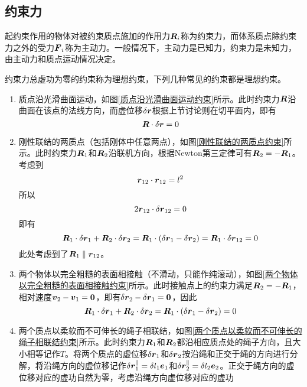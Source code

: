 \subsection{约束力}

起约束作用的物体对被约束质点施加的作用力$\boldsymbol{R}_i$称为{\heiti 约束力}，而体系质点除约束力之外的受力$\boldsymbol{F}_i$称为{\heiti 主动力}。一般情况下，主动力是已知力，约束力是未知力，由主动力和质点运动情况决定。

约束力总虚功为零的约束称为{\heiti 理想约束}，下列几种常见的约束都是理想约束。
\begin{enumerate}
	\item 质点沿光滑曲面运动，如图\ref{质点沿光滑曲面运动约束}所示。此时约束力$\boldsymbol{R}$沿曲面在该点的法线方向，而虚位移$\delta \boldsymbol{r}$根据上节讨论则在切平面内，即有
	\begin{equation*}
		\boldsymbol{R} \cdot \delta \boldsymbol{r} = 0
	\end{equation*}
	\item 刚性联结的两质点（包括刚体中任意两点），如图\ref{刚性联结的两质点约束}所示。此时约束力$\boldsymbol{R}_1$和$\boldsymbol{R}_2$沿联机方向，根据Newton第三定律可有$\boldsymbol{R}_2=-\boldsymbol{R}_1$。考虑到
	\begin{equation*}
		\boldsymbol{r}_{12} \cdot \boldsymbol{r}_{12} = l^2
	\end{equation*}
	所以
	\begin{equation*}
		2\boldsymbol{r}_{12} \cdot \delta \boldsymbol{r}_{12} = 0
	\end{equation*}
	即有
	\begin{equation*}
		\boldsymbol{R}_1 \cdot \delta \boldsymbol{r}_1 + \boldsymbol{R}_2 \cdot \delta \boldsymbol{r}_2 = \boldsymbol{R}_1 \cdot (\delta \boldsymbol{r}_1 - \delta \boldsymbol{r}_2) = \boldsymbol{R}_1 \cdot \delta \boldsymbol{r}_{12} = 0
	\end{equation*}
	此处考虑到了$\boldsymbol{R}_1 \parallel \boldsymbol{r}_{12}$。
	\item 两个物体以完全粗糙的表面相接触（不滑动，只能作纯滚动），如图\ref{两个物体以完全粗糙的表面相接触约束}所示。此时接触点上的约束力满足$\boldsymbol{R}_2 =- \boldsymbol{R}_1$，相对速度$\boldsymbol{v}_2-\boldsymbol{v}_1= \boldsymbol{0}$，即有$\delta \boldsymbol{r}_2-\delta \boldsymbol{r}_1 = \boldsymbol{0}$，因此
	\begin{equation*}
		\boldsymbol{R}_1 \cdot \delta \boldsymbol{r}_1 + \boldsymbol{R}_2 \cdot \delta \boldsymbol{r}_2 = \boldsymbol{R}_1 \cdot (\delta \boldsymbol{r}_1 - \delta \boldsymbol{r}_2) = 0
	\end{equation*}
	\item 两个质点以柔软而不可伸长的绳子相联结，如图\ref{两个质点以柔软而不可伸长的绳子相联结约束}所示。此时约束力$\boldsymbol{R}_1$和$\boldsymbol{R}_2$都沿相应质点处的绳子方向，且大小相等记作$T$。将两个质点的虚位移$\delta \boldsymbol{r}_1$和$\delta \boldsymbol{r}_2$按沿绳和正交于绳的方向进行分解，将沿绳方向的虚位移记作$\delta \boldsymbol{r}_1^\parallel = \delta l_1\boldsymbol{e}_1$和$\delta \boldsymbol{r}_2^\parallel = \delta l_2 \boldsymbol{e}_2$。正交于绳方向的虚位移对应的虚功自然为零，考虑沿绳方向虚位移对应的虚功

\end{enumerate}
